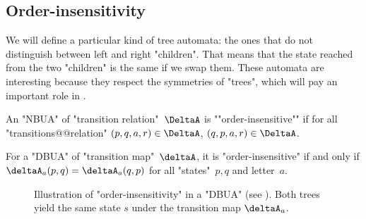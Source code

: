 \documentclass[a4paper,UKenglish,cleveref, autoref, thm-restate]{lipics-v2021}
\begin{document}
\subsection{Order-insensitivity}\label{sec:OrderAutomata}

We will define a particular kind of tree automata: the ones that do not distinguish between left and right "children".
That means that the state reached from the two "children" is the same if we swap them. These automata are
interesting because they respect the symmetries of "trees", which will pay an important role in .

\begin{definition}
	\AP An "NBUA" of "transition relation"~$\DeltaA$ is ""order-insensitive"" if for all "transitions@@relation" $(p,q,a,r) \in \DeltaA$,
	$(q,p,a,r) \in \DeltaA$.
\end{definition}

\begin{remark}\label{def:order-insensitive}
	For a "DBUA" of "transition map"~$\deltaA$, it is "order-insensitive" if and only if
	$\deltaA_a (p,q) = \deltaA_a (q,p)$ for all "states"~$p,q$ and letter~$a$.
\end{remark}


\begin{figure}[h]
	\centering
	\caption{Illustration of "order-insensitivity" in a "DBUA" (see ).
		Both trees yield the same state $s$ under the transition map $\deltaA_a$.}
	\label{fig:order-insensitivity}
\end{figure}
\end{document}

